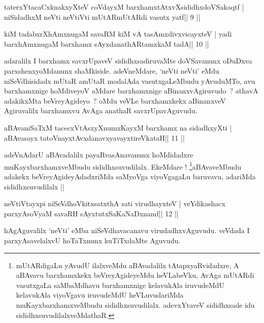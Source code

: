 
\begin{shl}
taterxYtacaCxknakxyXteV coVdayxM barxhamxtAtxvXsididhxdoVSakaqtf |
niSidadhxM neVti neVtiVti mUtARmUtARdi vasutx yatf\hfill || 9 ||
\end{shl}

\begin{shl}
kiM tadabxrXhAmxnugaM savaRM kiM vA tasAmxdivxvicayxteV |
yadi barxhAmxnugaM barxhamx sAyxdanathARtamxkaM tadA\hfill || 10 ||
\end{shl}

\begin{artha}
adaralilx I barxhamx savxrUpaveV sididhxsadiruvaMte doVSavanunx
oDuDxva parxshenxyoMdanunx shaMkiside. adeVneMdare, `neVti neVti' eMdu
niSeVdhisidadx mUtaR amUtaR modalAda vasutxgaLeMbudu yAvuduMTo, avu
barxhamxnige hoMdiveyoV aMdare barxhamxnige aBinanxvAgiruvudo~?
athavA adakikxMta beVreyAgideyo~? oMdu veVLe barxhamxkekx  aBinanxveV
Agiruvalilx barxhamxvu AvAga anathaR savxrUpavAguvudu. 
\end{artha}

\begin{shl}
aBAvaniSaTxM tacecxVtAsxyXnumxKayxM barxhamx na sidadhxyXti |
aBAvasayx tatoV\s nayxtAvxdanavxyavayxtireVkataH\hfill || 11 ||
\end{shl}

\begin{artha}
adeVnAdarU aBAvadalilx payaRvasAnavanunx hoMdidadxre
muKayxbarxhamxveMbudu sididhxsuvudilalx. EkeMdare
! \footnote{mUtARdigaLu yAvudU ilalxveMdu aBAvadalilx
  tAtapxyaRvidadxre, A aBAvavu barxhamxkekx beVreyAgideyeMdu
  heVLabeVku, AvAga mUtARdi vasutxgaLa saMbaMdhavu barxhamxnige
  kelavukAla iruvudeMdU kelavukAla viyoVgavu iruvudeMdU heVLuvudariMda
  muKayxbarxhamxveMbudu sididhxsuvudilalx. adevxYtaveV sididhxsade idu
  sididhxsuvudilalxveMdathaR.}aBAvaveMbudu adakekx beVreyAgideyAdadxriMda saMyoVga
viyoVgagaLu baruvavu, adariMda sididhxsuvudilalx ||
\end{artha}

\begin{shl}
neVtiVtayxpi niSeVdhoVkitxsatxthA sati virudhayxteV |
veYdikashacx parxyAsoV\s yaM savaRH sAyxtutxSaKaNaDxnamf\hfill || 12 ||
\end{shl}

\begin{artha}
hAgAguvalilx `neVti' eMba niSeVdhavacanavu virudadhxvAguvudu. veVdada I parxyAsavelalxvU hoTaTxnunx kuTiTxdaMte Aguvudu.
\end{artha}

